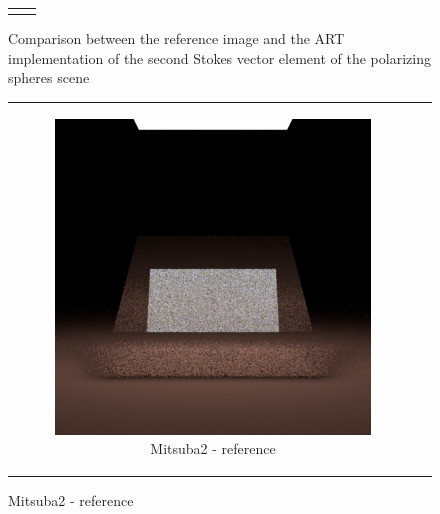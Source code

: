 \begin{figure}[h]
\begin{tabular}{cc}
\begin{subfigure}
			\caption{L1}
		\end{subfigure}
	\end{tabular}
	\caption{Comparison between the reference image and the ART implementation of the second Stokes vector element of the polarizing spheres scene}
	\label{fig:compare_polar_s1}
\end{figure}

\renewcommand\thesubfigure{\arabic{subfigure}}
\begin{figure}[h]
	\centering
	\begin{tabular}{cc}
		\begin{subfigure}
			{0.4\textwidth}\centering\includegraphics[width=\linewidth]{img/polarizing_plane_90.png}
			\caption{Mitsuba2 - reference}
		\end{subfigure}
		&
		\begin{subfigure}

\end{subfigure}
\end{tabular}
\end{figure}

